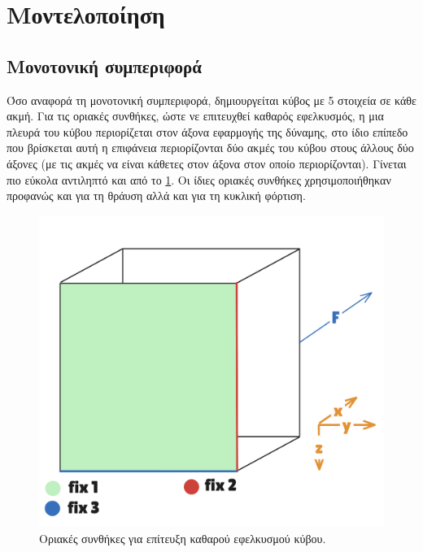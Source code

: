 \documentclass{article}
\begin{document}
\section{Μοντελοποίηση}

\subsection{Μονοτονική συμπεριφορά}
Όσο αναφορά τη μονοτονική συμπεριφορά, δημιουργείται κύβος με 5 στοιχεία σε κάθε ακμή. Για τις οριακές συνθήκες, ώστε νε επιτευχθεί καθαρός εφελκυσμός, η μια πλευρά του κύβου περιορίζεται στον άξονα εφαρμογής της δύναμης, στο ίδιο επίπεδο που βρίσκεται αυτή η επιφάνεια περιορίζονται δύο ακμές του κύβου στους άλλους δύο άξονες (με τις ακμές να είναι κάθετες στον άξονα στον οποίο περιορίζονται). Γίνεται πιο εύκολα αντιληπτό και από το \ref{fig:bcs}. Οι ίδιες οριακές συνθήκες χρησιμοποιήθηκαν προφανώς και για τη θράυση αλλά και για τη κυκλική φόρτιση.

\begin{figure}[H]
    \centering
    \includegraphics[width=0.7\linewidth]{media/bcs.png}
    \caption{Οριακές συνθήκες για επίτευξη καθαρού εφελκυσμού κύβου.}
    \label{fig:bcs}
\end{figure}
\end{document}
